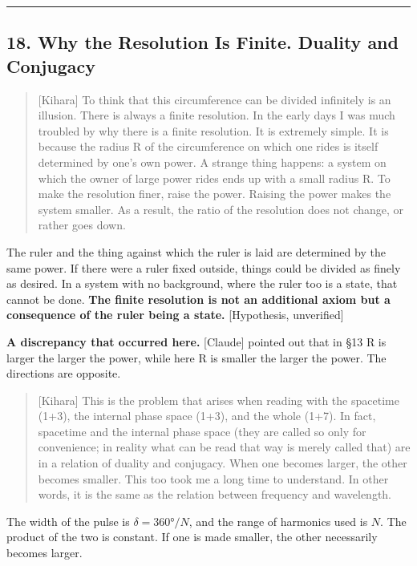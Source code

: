 \documentclass[
  a4paper,
]{article}
\begin{document}
\begin{center}\rule{0.5\linewidth}{0.5pt}\end{center}

\subsection{18. Why the Resolution Is Finite. Duality and
Conjugacy}\label{why-the-resolution-is-finite.-duality-and-conjugacy}

\begin{quote}
{[}Kihara{]} To think that this circumference can be divided infinitely
is an illusion. There is always a finite resolution. In the early days I
was much troubled by why there is a finite resolution. It is extremely
simple. It is because the radius R of the circumference on which one
rides is itself determined by one's own power. A strange thing happens:
a system on which the owner of large power rides ends up with a small
radius R. To make the resolution finer, raise the power. Raising the
power makes the system smaller. As a result, the ratio of the resolution
does not change, or rather goes down.
\end{quote}

The ruler and the thing against which the ruler is laid are determined
by the same power. If there were a ruler fixed outside, things could be
divided as finely as desired. In a system with no background, where the
ruler too is a state, that cannot be done. \textbf{The finite resolution
is not an additional axiom but a consequence of the ruler being a
state.} {[}Hypothesis, unverified{]}

\textbf{A discrepancy that occurred here.} {[}Claude{]} pointed out that
in §13 R is larger the larger the power, while here R is smaller the
larger the power. The directions are opposite.

\begin{quote}
{[}Kihara{]} This is the problem that arises when reading with the
spacetime (1+3), the internal phase space (1+3), and the whole (1+7). In
fact, spacetime and the internal phase space (they are called so only
for convenience; in reality what can be read that way is merely called
that) are in a relation of duality and conjugacy. When one becomes
larger, the other becomes smaller. This too took me a long time to
understand. In other words, it is the same as the relation between
frequency and wavelength.
\end{quote}

The width of the pulse is \(\delta = 360°/N\), and the range of
harmonics used is \(N\). The product of the two is constant. If one is
made smaller, the other necessarily becomes larger.
\end{document}
